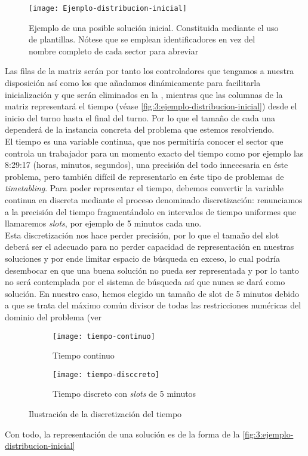 \begin{figure}
	\centering
	\texttt{[image: Ejemplo-distribucion-inicial]}
	\caption[Ejemplo de una solución inicial]{Ejemplo de una posible solución inicial. Constituida mediante el uso 
		de plantillas. 
		Nótese que se emplean identificadores en vez del nombre completo de cada sector para abreviar}
	\label{fig:3:ejemplo-distribucion-inicial}
\end{figure}

Las filas de la matriz serán por tanto los controladores que tengamos a nuestra disposición así como los que añadamos dinámicamente para facilitarla inicialización y que serán eliminados en la \fasedos{}, mientras que las columnas de la matriz representará el tiempo (véase \autoref{fig:3:ejemplo-distribucion-inicial}) desde el inicio del turno hasta el final del turno. Por lo que el tamaño de cada una dependerá de la instancia concreta del problema que estemos 
resolviendo.
\\

El tiempo es una variable continua, que nos permitiría conocer el sector que controla un trabajador para un momento exacto del tiempo como por ejemplo las 8:29:17 (horas, minutos, segundos), una precisión del todo innecesaria en éste problema, pero también difícil de representarlo en éste tipo de problemas de \textit{timetabling}. Para poder 
representar el tiempo, debemos convertir la variable continua en discreta mediante el proceso denominado 
discretización: renunciamos a la precisión del tiempo fragmentándolo en intervalos de tiempo uniformes que llamaremos \textit{slots}, por ejemplo de 5 minutos cada uno.
\\

Esta discretización nos hace perder precisión, por lo que el tamaño del slot deberá ser el adecuado para no perder capacidad de representación en nuestras soluciones y por ende limitar espacio de búsqueda en exceso, lo cual podría desembocar en que una buena solución no pueda ser representada y por lo tanto no será contemplada por el sistema de búsqueda así que nunca se dará como solución.
En nuestro caso, hemos elegido un tamaño de slot de 5 minutos debido a que se trata del máximo común divisor de todas las restricciones numéricas del dominio del problema (ver %

\begin{figure}[htbp]
	\begin{subfigure}{\linewidth}
		\centering
		\texttt{[image: tiempo-continuo]}
		\caption{Tiempo continuo}
		\label{fig:timepo-continuo}
	\end{subfigure}

	\begin{subfigure}{\linewidth}
		\centering
		\texttt{[image: tiempo-disccreto]}
		\caption{Tiempo discreto con \textit{slots} de 5 minutos}
		\label{fig:timepo-disccreto}
	\end{subfigure}

	\caption{Ilustración de la discretización del tiempo}
\end{figure}

Con todo, la representación de una solución es de la forma de la \autoref{fig:3:ejemplo-distribucion-inicial}









